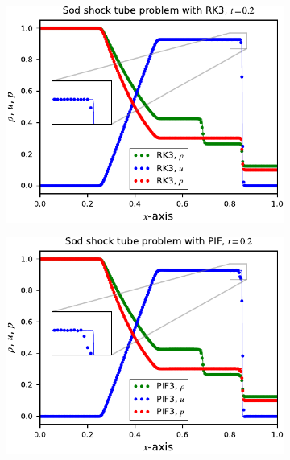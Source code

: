 \begin{figure}
    \centering
    \begin{subfigure}{0.495\textwidth}
        \centering
        \includegraphics[width=\textwidth]{fig/sod_rk3}
        \caption{}\label{subfig:sod_rk3}
    \end{subfigure}
    \begin{subfigure}{0.495\textwidth}
        \centering
        \includegraphics[width=\textwidth]{fig/sod_pif3}
        \caption{}\label{subfig:sod_pif3}
    \end{subfigure}
    \begin{subfigure}{0.495\textwidth}
        \centering

\end{subfigure}
\end{figure}
